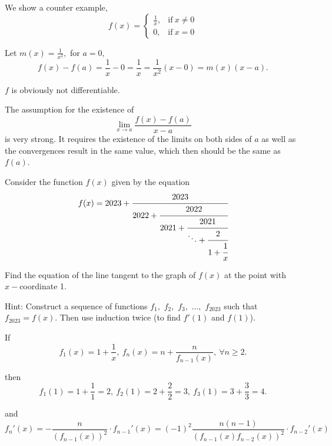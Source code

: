 \documentclass{article}
\begin{document}
\begin{soln}
    We show a counter example,
    \[
        f(x) = 
        \begin{cases}
            \frac{1}{x}, &\text{if}\ x \ne 0\\
            0, &\text{if}\ x = 0
        \end{cases}
    \]

    Let $m(x) = \frac{1}{x^2},$ for $a=0,$
    \[
        f(x) - f(a) = \frac{1}{x} - 0 = \frac{1}{x} = \frac{1}{x^2} (x - 0) = m(x) (x-a).
    \]

    $f$ is obviously not differentiable.
\end{soln}

\begin{remark*}
    The assumption for the existence of 
    \[
        \lim_{x \rightarrow a} \frac{f(x) - f(a)}{x-a}
    \]
    is very strong.
    It requires the existence of the limits on both sides of $a$ as well as the convergences result in the same value, which then should be the same as $f(a).$
\end{remark*}

\newpage

\begin{problem*}[Problem 3]
    Consider the function $f(x)$ given by the equation
    \[
        f(x) = 2023 + \cfrac{2023}{ 2022 + \cfrac{2022}{ 2021 + \cfrac{2021}{\ddots + \cfrac{2}{ 1+\cfrac{1}{x} } } } } 
    \]

    Find the equation of the line tangent to the graph of $f(x)$ at the point with $x-$coordinate 1.
    
    Hint: Construct a sequence of functions $f_1,$ $f_2,$ $f_3,$ $\ldots,$ $f_{2023}$ such that $f_{2023} = f(x).$
    Then use induction twice (to find $f'(1)$ and $f(1)$).
\end{problem*}

\begin{remark*}
    If 
    \[
        f_1(x) = 1 + \frac{1}{x},\ f_{n}(x) = n + \frac{n}{f_{n-1}(x)},\ \forall n \ge 2.
    \]
    
    then
    \[
        f_1(1) = 1 + \frac{1}{1} = 2,\ f_{2}(1) = 2 + \frac{2}{2} = 3,\ f_{3}(1) = 3 + \frac{3}{3} = 4.
    \]

    and
    \[
        f_{n}'(x) = -\frac{n}{(f_{n-1}(x))^2} \cdot f_{n-1}'(x) = (-1)^2\frac{n(n-1)}{(f_{n-1}(x) f_{n-2}(x))^2} \cdot f_{n-2}'(x)
    \]
\end{remark*}
\end{document}
